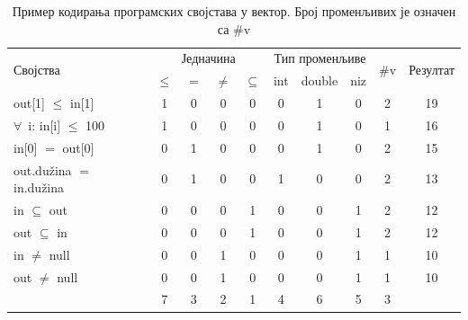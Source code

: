 \documentclass[a4paper]{article}
\begin{document}
{%
\begin{table}[]
\centering
\caption{Пример кодирања програмских својстава у вектор. Број променљивих је означен са \#v}
\label{table:latent_coding}
\begin{tabular}{l|c|c|c|c|c|c|c|c|c|}
\hline
\multicolumn{1}{|l|}{\multirow{2}{*}{Својства}} & \multicolumn{4}{c|}{Једначина} & \multicolumn{3}{c|}{Тип променљиве} & \multirow{2}{*}{\#v} & \multirow{2}{*}{Резултат} \\ \cline{2-8}
\multicolumn{1}{|l|}{}                          & $\leq$  & $=$  & $\neq$ & $\subseteq$ & int       & double       & niz      &                      &                           \\ \hline
\multicolumn{1}{|l|}{out[1] $\leq$ in[1]}                          & 1           & 0  & 0  & 0      & 0         & 1            & 0        & 2                    & 19                        \\ \hline
\multicolumn{1}{|l|}{$\forall$\ i: in[i] $\leq$ 100}                          & 1           & 0  & 0  & 0      & 0         & 1            & 0        & 1                    & 16                        \\ \hline
\multicolumn{1}{|l|}{in[0] $=$ out[0]}                          & 0           & 1  & 0  & 0      & 0         & 1            & 0        & 2                    & 15                        \\ \hline
\multicolumn{1}{|l|}{out.dužina $=$ in.dužina}                          & 0           & 1  & 0  & 0      & 1         & 0            & 0        & 2                    & 13                        \\ \hline
\multicolumn{1}{|l|}{in $\subseteq$ out}                          & 0           & 0  & 0  & 1      & 0         & 0            & 1        & 2                    & 12                        \\ \hline
\multicolumn{1}{|l|}{out $\subseteq$ in}                          & 0           & 0  & 0  & 1      & 0         & 0            & 1        & 2                    & 12                        \\ \hline
\multicolumn{1}{|l|}{in $\neq$ null}                          & 0           & 0  & 1  & 0      & 0         & 0            & 1        & 1                    & 10                        \\ \hline
\multicolumn{1}{|l|}{out $\neq$ null}                          & 0           & 0  & 1  & 0      & 0         & 0            & 1        & 1                    & 10                        \\ \hhline{|=|=|=|=|=|=|=|=|=|=|}
\multicolumn{1}{|l|}{Тежине модела}             & 7           & 3  & 2  & 1      & 4         & 6            & 5        & 3                    & \multicolumn{1}{l|}{}     \\ \cline{1-10} 
\end{tabular}
\end{table}

}
\end{document}
